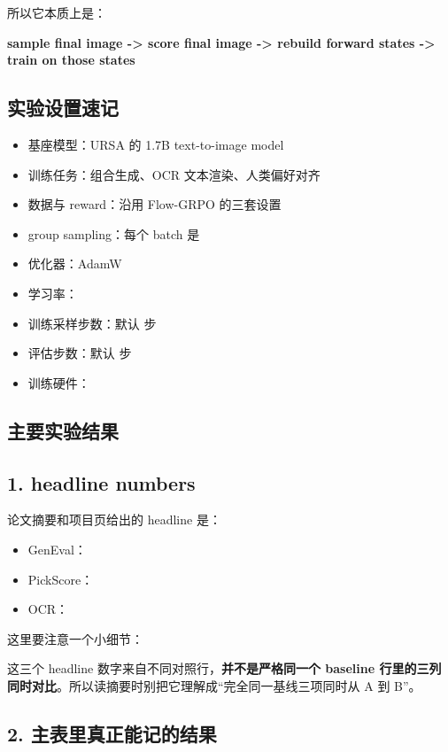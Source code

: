 所以它本质上是：

\textbf{sample final image -> score final image -> rebuild forward states -> train on those states}

\subsection{实验设置速记}

\begin{itemize}[leftmargin=1.5em]
  \item 基座模型：URSA 的 1.7B text-to-image model
  \item 训练任务：组合生成、OCR 文本渲染、人类偏好对齐
  \item 数据与 reward：沿用 Flow-GRPO 的三套设置
  \item group sampling：每个 batch 是 
  \item 优化器：AdamW
  \item 学习率：
  \item 训练采样步数：默认  步
  \item 评估步数：默认  步
  \item 训练硬件：
\end{itemize}

\subsection{主要实验结果}

\subsection{1. headline numbers}

论文摘要和项目页给出的 headline 是：

\begin{itemize}[leftmargin=1.5em]
  \item GenEval：
  \item PickScore：
  \item OCR：
\end{itemize}

这里要注意一个小细节：

这三个 headline 数字来自不同对照行，\textbf{并不是严格同一个 baseline 行里的三列同时对比}。所以读摘要时别把它理解成“完全同一基线三项同时从 A 到 B”。

\subsection{2. 主表里真正能记的结果}

